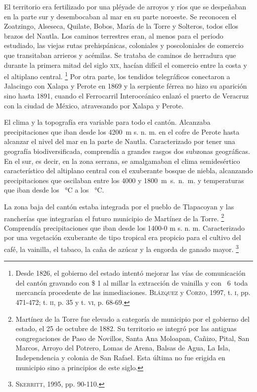 \documentclass[14pt,twoside,final]{extbook} %
\let\oldfootnote\footnote
\renewcommand\footnote[1]{%
\oldfootnote{\hspace{1mm}#1}}
\begin{document}
El territorio era fertilizado por una pléyade de arroyos y ríos que se despeñaban en la parte sur y desembocaban al mar en su parte noroeste. Se reconocen el Zoatzingo, Alseseca, Quilate, Bobos, María de la Torre y Solteros, todos ellos brazos del Nautla. Los caminos terrestres eran, al menos para el periodo estudiado, las viejas rutas prehispánicas, coloniales y poscoloniales de comercio que transitaban arrieros y acémilas. Se trataba de caminos de herradura que durante la primera mitad del siglo \textsc{xix}, hacían difícil el comercio entre la costa y el altiplano central.\footnote{Desde 1826, el gobierno del estado intentó mejorar las vías de comunicación del cantón gravando con \$ 1 al millar la extracción de vainilla y con \textcent\ 6\textonequarter\ toda mercancía procedente de las inmediaciones. \textsc{Blázquez} y \textsc{Corzo}, 1997, t. \textsc{i}, pp. 471-472; t. \textsc{ii}, p. 35 y t. \textsc{vi}, p. 68-69.} Por otra parte, los tendidos telegráficos conectaron a Jalacingo con Xalapa y Perote en 1869 y la serpiente férrea no hizo su aparición sino hasta 1891, cuando el Ferrocarril Interoceánico enlazó el puerto de Veracruz con la ciudad de México, atravesando por Xalapa y Perote.

El clima y la topografía era variable para todo el cantón. Alcanzaba precipitaciones que iban desde los 4200~m s. n. m. en el cofre de Perote hasta alcanzar el nivel del mar en la parte de Nautla. Caracterizado por tener una geografía biodiversificada, comprendía a grandes rasgos dos subzonas geográficas. En el sur, es decir, en la zona serrana, se amalgamaban el clima semidesértico característico del altiplano central con el exuberante bosque de niebla, alcanzando precipitaciones que oscilaban entre los 4000 y \mbox{1800 m s. n. m.} y temperaturas que iban desde los ~°C a los ~°C.

La zona baja del cantón estaba integrada por el pueblo de Tlapacoyan y las rancherías que integrarían el futuro municipio de Martínez de la Torre.\footnote{Martínez de la Torre fue elevado a categoría de municipio por el gobierno del estado, el 25 de octubre de 1882. Su territorio se integró por las antiguas congregaciones de Paso de Novillos, Santa Ana Moloapan, Cañizo, Pital, San Marcos, Arroyo del Potrero, Lomas de Arena, Balsas de Agua, La Isla, Independencia y colonia de San Rafael. Esta última no fue erigida en municipio sino a principios de este siglo.} Comprendía precipitaciones que iban desde los 1400-0 m s. n. m. Caracterizado por una vegetación exuberante de tipo tropical era propicio para el cultivo del café, la vainilla, el tabaco, la caña de azúcar y la engorda de ganado mayor.\footnote{\textsc{Skerritt}, 1995, pp. 90-110.}
\end{document}
